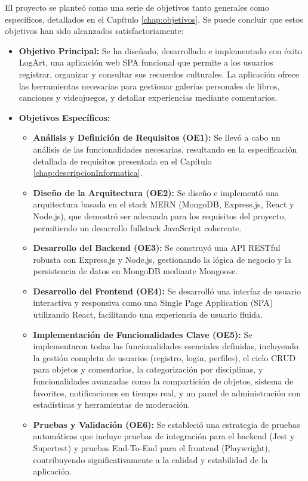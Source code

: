 El proyecto se planteó como una serie de objetivos tanto generales como específicos, detallados en el Capítulo \ref{chap:objetivos}. Se puede concluir que estos objetivos han sido alcanzados satisfactoriamente:
\begin{itemize}
    \item \textbf{Objetivo Principal:} Se ha diseñado, desarrollado e implementado con éxito LogArt, una aplicación web SPA funcional que permite a los usuarios registrar, organizar y consultar sus recuerdos culturales. La aplicación ofrece las herramientas necesarias para gestionar galerías personales de libros, canciones y videojuegos, y detallar experiencias mediante comentarios.
    \item \textbf{Objetivos Específicos:}
    \begin{itemize}
        \item \textbf{Análisis y Definición de Requisitos (OE1):} Se llevó a cabo un análisis de las funcionalidades necesarias, resultando en la especificación detallada de requisitos presentada en el Capítulo \ref{chap:descripcionInformatica}.
        \item \textbf{Diseño de la Arquitectura (OE2):} Se diseño e implementó una arquitectura basada en el stack MERN (MongoDB, Express.js, React y Node.js), que demostró ser adecuada para los requisitos del proyecto, permitiendo un desarrollo fullstack JavaScript coherente.
        \item \textbf{Desarrollo del Backend (OE3):} Se construyó una API RESTful robusta con Express.js y Node.js, gestionando la lógica de negocio y la persistencia de datos en MongoDB mediante Mongoose.
        \item \textbf{Desarrollo del Frontend (OE4):} Se desarrolló una interfaz de usuario interactiva y responsiva como una Single Page Application (SPA) utilizando React, facilitando una experiencia de usuario fluida.
        \item \textbf{Implementación de Funcionalidades Clave (OE5):} Se implementaron todas las funcionalidades esenciales definidas, incluyendo la gestión completa de usuarios (registro, login, perfiles), el ciclo CRUD para objetos y comentarios, la categorización por disciplinas, y funcionalidades avanzadas como la compartición de objetos, sistema de favoritos, notificaciones en tiempo real, y un panel de administración con estadísticas y herramientas de moderación.
        \item \textbf{Pruebas y Validación (OE6):} Se estableció una estrategia de pruebas automáticas que incluye pruebas de integración para el backend (Jest y Supertest) y pruebas End-To-End para el frontend (Playwright), contribuyendo significativamente a la calidad y estabilidad de la aplicación.

\end{itemize}
\end{itemize}
